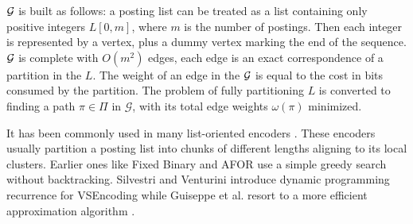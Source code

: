 \documentclass{sig-alternate-05-2015}
\begin{document}
$ \cal G $ is built as follows: a posting list can be treated as a list containing only positive integers $ L[0,m] $, where $ m $ is the number of postings.
Then each integer is represented by a vertex, plus a dummy vertex marking the end of the sequence.
$ \cal G $ is complete with $ O(m^2) $ edges, each edge is an exact correspondence of a partition in the $ L $.
The weight of an edge in the $ \cal G $ is equal to the cost in bits consumed by the partition.
The problem of fully partitioning $ L $ is converted to finding a path $\pi \in \Pi $ in $\mathcal{G}$, with its total edge weights $ \omega(\pi) $ minimized.

It has been commonly used in many list-oriented encoders \cite{song2016optimizing}.
These encoders usually partition a posting list into chunks of different lengths aligning to its local clusters.
Earlier ones like Fixed Binary \cite{anh2004index} and AFOR use a simple greedy search without backtracking.
Silvestri and Venturini introduce dynamic programming recurrence for VSEncoding \cite{silvestri2010vsencoding} while Guiseppe et al. resort to a more efficient approximation algorithm \cite{ottaviano2014partitioned}.
\end{document}
